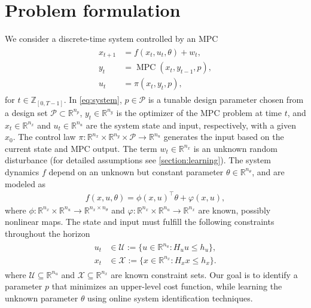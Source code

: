 \documentclass[journal,twoside,web,final]{ieeecolor}
\theoremstyle{definition}
\newcommand{\R}{\mathbb{R}}
\newcommand{\Z}{\mathbb{Z}}
\begin{document}
\section{Problem formulation}
\label{section:pform}
We consider a discrete-time system controlled by an MPC
%
\begin{align}
\begin{split}
x_{t+1}&=f(x_t,u_t,\theta) + w_t,\\
y_t&=\operatorname{MPC}(x_t,y_{t-1},p),\\
u_t&=\pi(x_t,y_t,p),
\end{split}\label{eq:system}
\end{align}
%
for $t\in\Z_{[0,T-1]}$. In \cref{eq:system}, $p\in \mathcal{P}$ is a tunable design parameter chosen from a design set $\mathcal{P}\subset \R^{n_p}$, 
$y_t \in \R^{n_y}$ is the optimizer of the MPC problem at time $t$, 
and $x_t\in\R^{n_x}$ and $u_t\in\R^{n_u}$ are the system state and input, respectively, with a given $x_0$. 
The control law $\pi:\R^{n_x} \times \R^{n_y} \times \mathcal{P}\to \R^{n_u}$ generates the input based on the current state and MPC output. 
The term $w_t\in\R^{n_x}$ is an unknown random disturbance (for detailed assumptions see \cref{section:learning}). 
The system dynamics $f$ depend on an unknown but constant parameter $\theta\in\R^{n_\theta}$, and are modeled as
\begin{align}
f(x,u,\theta) = \phi(x,u)^{\top}\theta + \varphi(x,u), \label{eq:true_dynamics}
\end{align}
where $\phi:\R^{n_x} \times \R^{n_u} \to \R^{n_x \times n_\theta}$ and $\varphi:\R^{n_x}\times \R^{n_u}\to \R^{n_x}$ are known, possibly nonlinear maps. 
The state and input must fulfill the following constraints throughout the horizon
\begin{align}
\begin{split}
u_t & \in \mathcal{U} := \{ u \in \R^{n_u} : H_u u \leq h_u \}, \\
x_t & \in \mathcal{X} := \{ x \in \R^{n_x} : H_x x \leq h_x \}.
\end{split} \label{eq:constraints}
\end{align}
where $\mathcal{U} \subseteq \R^{n_u}$ and $\mathcal{X} \subseteq \R^{n_x}$ are known constraint sets. 
Our goal is to identify a parameter $p$ that minimizes an upper-level cost function, while learning the unknown parameter $\theta$ using online system identification techniques.
\end{document}
